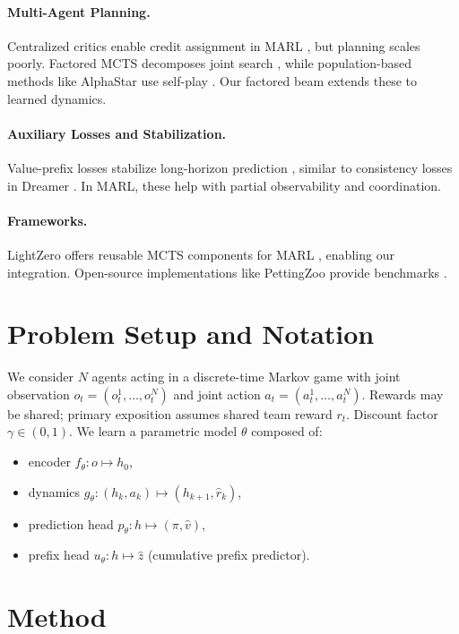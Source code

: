 \documentclass[10pt]{article}
\begin{document}
\paragraph{Multi-Agent Planning.} Centralized critics enable credit assignment in MARL \cite{lowe2017multi}, but planning scales poorly. Factored MCTS decomposes joint search \cite{bellemare2024multiagent}, while population-based methods like AlphaStar use self-play \cite{vinyals2019grandmaster}. Our factored beam extends these to learned dynamics.

\paragraph{Auxiliary Losses and Stabilization.} Value-prefix losses stabilize long-horizon prediction \cite{wang2024efficientzero}, similar to consistency losses in Dreamer \cite{hafner2023dreamer}. In MARL, these help with partial observability and coordination.

\paragraph{Frameworks.} LightZero offers reusable MCTS components for MARL \cite{lightzero2023}, enabling our integration. Open-source implementations like PettingZoo provide benchmarks \cite{terry2020pettingzoo}.

\section{Problem Setup and Notation}
We consider $N$ agents acting in a discrete-time Markov game with joint observation $o_t=(o_t^1,\dots,o_t^N)$ and joint action $a_t=(a_t^1,\dots,a_t^N)$. Rewards may be shared; primary exposition assumes shared team reward $r_t$. Discount factor $\gamma\in(0,1)$. We learn a parametric model $\theta$ composed of:
\begin{itemize}[noitemsep]
  \item encoder $f_\theta: o \mapsto h_0$,
  \item dynamics $g_\theta: (h_k,a_k)\mapsto (h_{k+1}, \hat r_k)$,
  \item prediction head $p_\theta: h \mapsto (\pi,\hat v)$,
  \item prefix head $u_\theta: h \mapsto \hat z$ (cumulative prefix predictor).
\end{itemize}

\section{Method}
\end{document}
